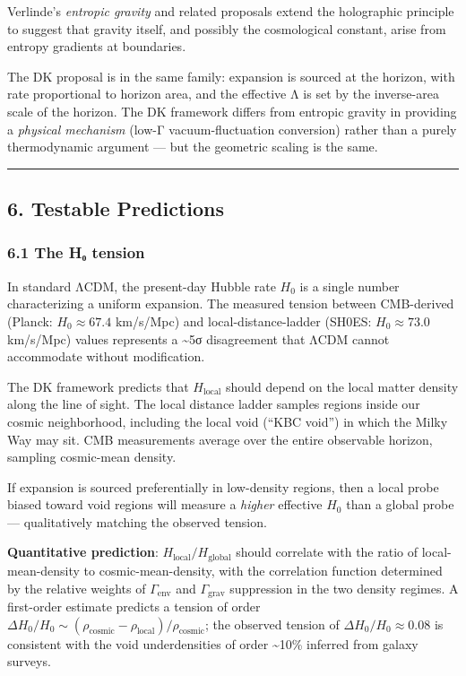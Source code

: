 \documentclass[
]{article}
\begin{document}
Verlinde's \emph{entropic gravity} and related proposals extend the
holographic principle to suggest that gravity itself, and possibly the
cosmological constant, arise from entropy gradients at boundaries.

The DK proposal is in the same family: expansion is sourced at the
horizon, with rate proportional to horizon area, and the effective Λ is
set by the inverse-area scale of the horizon. The DK framework differs
from entropic gravity in providing a \emph{physical mechanism} (low-Γ
vacuum-fluctuation conversion) rather than a purely thermodynamic
argument --- but the geometric scaling is the same.

\begin{center}\rule{0.5\linewidth}{0.5pt}\end{center}

\subsection{6. Testable Predictions}\label{testable-predictions}

\subsubsection{6.1 The H₀ tension}\label{the-hux2080-tension}

In standard ΛCDM, the present-day Hubble rate \(H_0\) is a single number
characterizing a uniform expansion. The measured tension between
CMB-derived (Planck: \(H_0 \approx 67.4\) km/s/Mpc) and
local-distance-ladder (SH0ES: \(H_0 \approx 73.0\) km/s/Mpc) values
represents a \textasciitilde5σ disagreement that ΛCDM cannot accommodate
without modification.

The DK framework predicts that \(H_{\text{local}}\) should depend on the
local matter density along the line of sight. The local distance ladder
samples regions inside our cosmic neighborhood, including the local void
(``KBC void'') in which the Milky Way may sit. CMB measurements average
over the entire observable horizon, sampling cosmic-mean density.

If expansion is sourced preferentially in low-density regions, then a
local probe biased toward void regions will measure a \emph{higher}
effective \(H_0\) than a global probe --- qualitatively matching the
observed tension.

\textbf{Quantitative prediction}: \(H_{\text{local}}/H_{\text{global}}\)
should correlate with the ratio of local-mean-density to
cosmic-mean-density, with the correlation function determined by the
relative weights of \(\Gamma_{\text{env}}\) and \(\Gamma_{\text{grav}}\)
suppression in the two density regimes. A first-order estimate predicts
a tension of order
\(\Delta H_0 / H_0 \sim (\rho_{\text{cosmic}} - \rho_{\text{local}}) / \rho_{\text{cosmic}}\);
the observed tension of \(\Delta H_0 / H_0 \approx 0.08\) is consistent
with the void underdensities of order \textasciitilde10\% inferred from
galaxy surveys.
\end{document}
